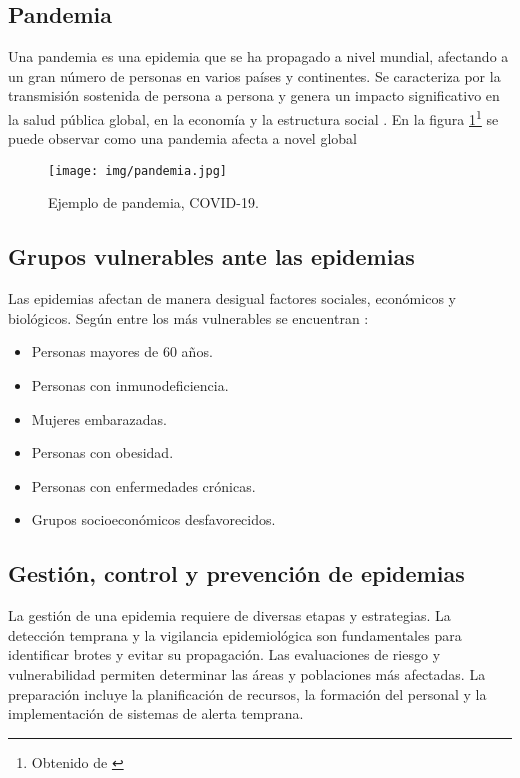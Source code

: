 \subsection{Pandemia}
Una pandemia es una epidemia que se ha propagado a nivel mundial, afectando a un gran número de personas en varios países y continentes. Se caracteriza por la transmisión sostenida de persona a persona y genera un impacto significativo en la salud pública global, en la economía y la estructura social \cite{dias2024towards}. En la figura \ref{fig:pandemia}\footnote{Obtenido de \cite{isglobal_coronavirus_orden}} se puede observar como una pandemia afecta a novel global

\begin{figure}[H]
    \centering
    \texttt{[image: img/pandemia.jpg]}
    \caption{Ejemplo de pandemia, COVID-19.}
    \label{fig:pandemia}
    \vspace{0.5cm} %
\end{figure}

\subsection{Grupos vulnerables ante las epidemias}
Las epidemias afectan de manera desigual factores sociales, económicos y biológicos. Según \cite{nasution2021poblaciones} entre los más vulnerables se encuentran :
\begin{itemize}
  \item Personas mayores de 60 años.
  \item Personas con inmunodeficiencia.
  \item Mujeres embarazadas.
   \item Personas con obesidad.
   \item Personas con enfermedades crónicas.
   \item Grupos socioeconómicos desfavorecidos. 
\end{itemize}

\subsection{Gestión, control y prevención de epidemias}
La gestión de una epidemia requiere de diversas etapas y estrategias. La detección temprana y la vigilancia epidemiológica son fundamentales para identificar brotes y evitar su propagación. Las evaluaciones de riesgo y vulnerabilidad permiten determinar las áreas y poblaciones más afectadas. La preparación incluye la planificación de recursos, la formación del personal y la implementación de sistemas de alerta temprana.

